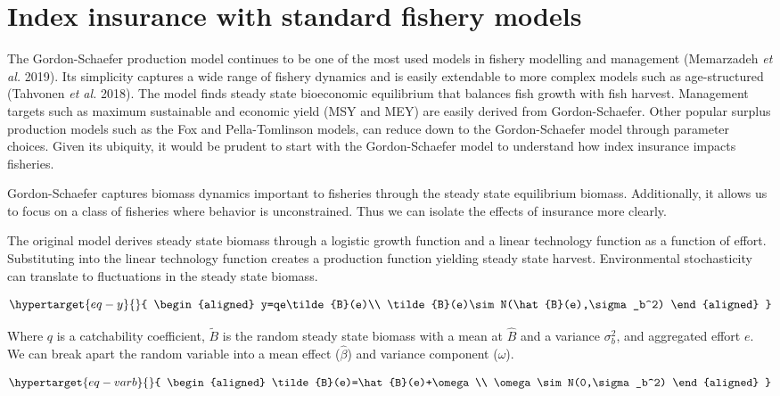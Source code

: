 \documentclass[
  letterpaper,
  DIV=11,
  numbers=noendperiod]{scrartcl}
\theoremstyle{plain}
\theoremstyle{plain}
\theoremstyle{remark}
\begin{document}
\hypertarget{sec-common}{%
\section{Index insurance with standard fishery
models}\label{sec-common}}

The Gordon-Schaefer production model continues to be one of the most
used models in fishery modelling and management (Memarzadeh \emph{et
al.} 2019). Its simplicity captures a wide range of fishery dynamics and
is easily extendable to more complex models such as age-structured
(Tahvonen \emph{et al.} 2018). The model finds steady state bioeconomic
equilibrium that balances fish growth with fish harvest. Management
targets such as maximum sustainable and economic yield (MSY and MEY) are
easily derived from Gordon-Schaefer. Other popular surplus production
models such as the Fox and Pella-Tomlinson models, can reduce down to
the Gordon-Schaefer model through parameter choices. Given its ubiquity,
it would be prudent to start with the Gordon-Schaefer model to
understand how index insurance impacts fisheries.

Gordon-Schaefer captures biomass dynamics important to fisheries through
the steady state equilibrium biomass. Additionally, it allows us to
focus on a class of fisheries where behavior is unconstrained. Thus we
can isolate the effects of insurance more clearly.

The original model derives steady state biomass through a logistic
growth function and a linear technology function as a function of
effort. Substituting into the linear technology function creates a
production function yielding steady state harvest. Environmental
stochasticity can translate to fluctuations in the steady state biomass.

\begin{equation}\protect\hypertarget{eq-y}{}{
\begin{aligned}
y=qe\tilde{B}(e)\\
\tilde{B}(e)\sim N(\hat{B}(e),\sigma_b^2)
\end{aligned}
}\label{eq-y}\end{equation}

Where \(q\) is a catchability coefficient, \(\tilde{B}\) is the random
steady state biomass with a mean at \(\hat{B}\) and a variance
\(\sigma_b^2\), and aggregated effort \(e\). We can break apart the
random variable into a mean effect (\(\hat{\beta}\)) and variance
component (\(\omega\)).

\begin{equation}\protect\hypertarget{eq-varb}{}{
\begin{aligned}
\tilde{B}(e)=\hat{B}(e)+\omega \\
\omega\sim N(0,\sigma_b^2)
\end{aligned}
}\label{eq-varb}\end{equation}
\end{document}
